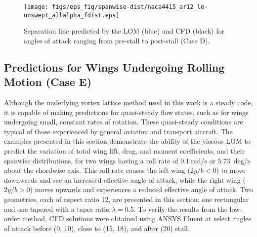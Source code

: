 \begin{figure}[!h]
    \centering
    \texttt{[image: figs/eps\_fig/spanwise-dist/naca4415\_ar12\_le-unswept\_allalpha\_fdist.eps]}
    \caption{Separation line predicted by the LOM (blue) and CFD (black) for angles of attack ranging from pre-stall to post-stall (Case D).}
    \label{fig:naca4415_ar12_le-unswept_allalpha_fdist}
\end{figure}

\subsection{Predictions for Wings Undergoing Rolling Motion (Case E)}
\label{sec:rolling-wings}
Although the underlying vortex lattice method used in this work is a steady code, it is capable of making predictions for quasi-steady flow states, such as for wings undergoing small, constant rates of rotation.
These quasi-steady conditions are typical of those experienced by general aviation and transport aircraft.
The examples presented in this section demonstrate the ability of the viscous LOM to predict the variation of total wing lift, drag, and moment coefficients, and their spanwise distributions, for two wings having a roll rate of $\SI{0.1}{\radian\per\second}$ or $\SI{5.73}{\deg\per\second}$ about the chordwise axis. This roll rate causes the left wing ($2y/b < 0$) to move downwards and see an increased effective angle of attack, while the right wing ($2y/b > 0$) moves upwards and experiences a reduced effective angle of attack. Two geometries, each of aspect ratio 12, are presented in this section: one rectangular and one tapered with a taper ratio $\lambda = 0.5$.
To verify the results from the low-order method, CFD solutions were obtained using ANSYS Fluent at select angles of attack before (0\degree, 10\degree), close to (15\degree, 18\degree), and after (20\degree) stall.

